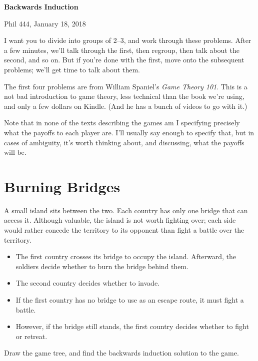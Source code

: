 \documentclass{article}
\begin{document}
\begin{center}
{\Large \textbf{Backwards Induction}} \bigskip

{\large Phil 444, January 18, 2018}
\end{center}

\noindent I want you to divide into groups of 2--3, and work through these problems. After a few minutes, we'll talk through the first, then regroup, then talk about the second, and so on. But if you're done with the first, move onto the subsequent problems; we'll get time to talk about them.

The first four problems are from William Spaniel's \emph{Game Theory 101}. This is a not bad introduction to game theory, less technical than the book we're using, and only a few dollars on Kindle. (And he has a bunch of videos to go with it.)

Note that in none of the texts describing the games am I specifying precisely what the payoffs to each player are. I'll usually say enough to specify that, but in cases of ambiguity, it's worth thinking about, and discussing, what the payoffs will be.

\section{Burning Bridges}
\label{burningbridges}

A small island sits between the two. Each country has only one bridge that can access it. Although valuable, the island is not worth fighting over; each side would rather concede the territory to its opponent than fight a battle over the territory.

\begin{itemize}
\item{} The first country crosses its bridge to occupy the island. Afterward, the soldiers decide whether to burn the bridge behind them.

\item{} The second country decides whether to invade.

\item{} If the first country has no bridge to use as an escape route, it must fight a battle.

\item{} However, if the bridge still stands, the first country decides whether to fight or retreat.

\end{itemize}

\noindent Draw the game tree, and find the backwards induction solution to the game.
\end{document}
